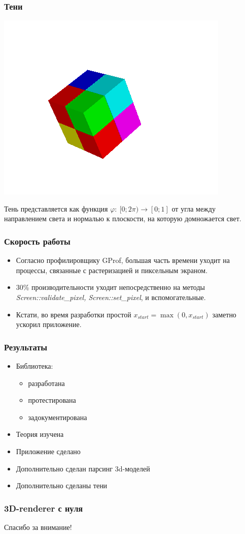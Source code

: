 \documentclass{beamer}
\begin{document}
\begin{frame}
\frametitle{Тени}

\begin{center}
\includegraphics[width=0.5 \linewidth]{../example/cube_shadows.png}
\end{center}

Тень представляется как функция $\varphi:\ [0; 2\pi) \to [0; 1]$ от угла между направлением света и нормалью к плоскости, на которую домножается свет.

\end{frame}


\begin{frame}
\frametitle{Скорость работы}

\begin{itemize}
\item Согласно профилировщику GProf, большая часть времени уходит на процессы, связанные с растеризацией и пиксельным экраном.

\item 30\% производительности уходит непосредственно на методы \textit{Screen::validate\_pixel, Screen::set\_pixel}, и вспомогательные.

\item Кстати, во время разработки простой $x_{start} = \max(0, x_{start})$ заметно ускорил приложение.
\end{itemize}
\end{frame}

\begin{frame}
\frametitle{Результаты}

\begin{itemize}
\item Библиотека:
\begin{itemize}
	\item разработана
	\item протестирована
	\item задокументирована
\end{itemize}
\item Теория изучена
\item Приложение сделано
\item Дополнительно сделан парсинг 3d-моделей
\item Дополнительно сделаны тени
\end{itemize}
\end{frame}

\begin{frame}
\frametitle{3D-renderer с нуля}

\begin{center}
Спасибо за внимание!
\end{center}
\end{frame}
\end{document}
